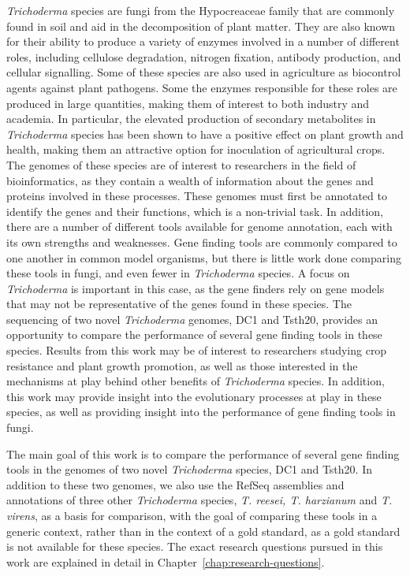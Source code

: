 \textit{Trichoderma} species are fungi from the Hypocreaceae family
 that are commonly found in soil and aid in the decomposition of plant matter.
 They are also known for their ability to produce a variety of enzymes involved in a number of different roles, including cellulose degradation, nitrogen fixation, antibody production, and cellular signalling. Some of these species are also used in agriculture as biocontrol agents against plant pathogens. Some the enzymes responsible for these roles are produced in large quantities, making them of interest to both industry and academia. In particular, the elevated production of secondary metabolites in \textit{Trichoderma} species has been shown to have a positive effect on plant growth and health, making them an attractive option for inoculation of agricultural crops. The genomes of these species are of interest to researchers in the field of bioinformatics, as they contain a wealth of information about the genes and proteins involved in these processes. These genomes must first be annotated to identify the genes and their functions, which is a non-trivial task. In addition, there are a number of different tools available for genome annotation, each with its own strengths and weaknesses. Gene finding tools are commonly compared to one another in common model organisms, but there is little work done comparing these tools in fungi, and even fewer in \textit{Trichoderma} species. A focus on \textit{Trichoderma} is important in this case, as the gene finders rely on gene models that may not be representative of the genes found in these species.
  The sequencing of two novel \textit{Trichoderma} genomes, DC1 and Tsth20, provides an opportunity to compare the performance of several gene finding tools in these species. Results from this work may be of interest to researchers studying crop resistance and plant growth promotion, as well as those interested in the mechanisms at play behind other benefits of \textit{Trichoderma} species. In addition, this work may provide insight into the evolutionary processes at play in these species, as well as providing insight into the performance of gene finding tools in fungi.

 The main goal of this work is to compare the performance of several gene finding tools in the genomes of two novel \textit{Trichoderma} species, DC1 and Tsth20. In addition to these two genomes, we also use the RefSeq assemblies and annotations of three other \textit{Trichoderma} species, \textit{T. reesei, T. harzianum} and \textit{T. virens}, as a basis for comparison, with the goal of comparing these tools in a generic context, rather than in the context of a gold standard, as a gold standard is not available for these species. The exact research questions pursued in this work are explained in detail in Chapter~\ref{chap:research-questions}. 

